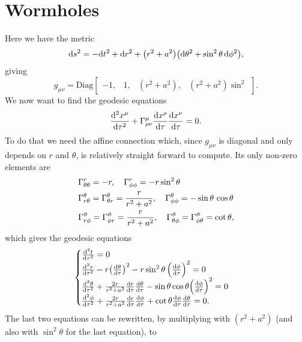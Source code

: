 \documentclass[11pt,a4paper, 
swedish, english %
]{article}
\begin{document}
\section{Wormholes}
Here we have the metric
\begin{equation}\label{eq12:ds}
\mathrm{d}{s}^2=-\mathrm{d}{t}^2+\mathrm{d}{r}^2
+\qty(r^2+a^2)\qty(\mathrm{d}\theta^2+\sin^2\theta\,\mathrm{d}\phi^2),
\end{equation}
giving 
\begin{equation}
g_{\mu\nu}=\text{Diag}
\begin{bmatrix}
-1,& 1,& (r^2+a^2),& (r^2+a^2)\sin^2
\end{bmatrix}.
\end{equation}
We now want to find the geodesic equations
\begin{equation}
\dv[2]{x^\mu}{\tau}+\Gamma^\mu_{\rho\nu}\dv{x^\rho}{\tau}\dv{x^\nu}{\tau}=0. 
\end{equation}
To do that we need the affine connection which, since $g_{\mu\nu}$ is
diagonal and only depends on $r$ and $\theta$, is relatively straight
forward to compute. Its only non-zero elements are
\begin{equation}\label{eq12:Gamma}
\begin{aligned}
&\Gamma^r_{\theta\theta}=-r\qc
\Gamma^r_{\phi\phi}=-r\sin^2\theta\\
&\Gamma^{\theta}_{r\theta}=\Gamma^{\theta}_{\theta r}
=\frac{r}{r^2+a^2}\qc
\Gamma^{\theta}_{\phi\phi}=-\sin\theta\,\cos\theta\\
&\Gamma^{\phi}_{r\phi}=\Gamma^{\phi}_{\phi r}=\frac{r}{r^2+a^2}\qc
\Gamma^\phi_{\theta\phi}=\Gamma^\phi_{\phi\theta}=\cot\theta,
\end{aligned}
\end{equation}
which gives the geodesic equations
\begin{equation}\label{eq12:geodesic}
\begin{cases}
\dv[2]{t}{\tau}=0\\
\dv[2]{r}{\tau}-r\qty(\dv{\theta}{\tau})^2
-r\sin^2\theta\,\qty(\dv{\phi}{\tau})^2=0\\
\dv[2]{\theta}{\tau}+\frac{2r}{r^2+a^2}\dv{r}{\tau}\dv{\theta}{\tau}
-\sin\theta\cos\theta\qty(\dv{\phi}{\tau})^2=0\\
\dv[2]{\phi}{\tau}+\frac{2r}{r^2+a^2}\dv{r}{\tau}\dv{\phi}{\tau}
+\cot\theta\dv{\phi}{\tau}\dv{\theta}{\tau}=0.
\end{cases}
\end{equation}
The last two equations can be rewritten, by multiplying with
$(r^2+a^2)$ (and also with $\sin^2\theta$ for the last equation), to
\end{document}
